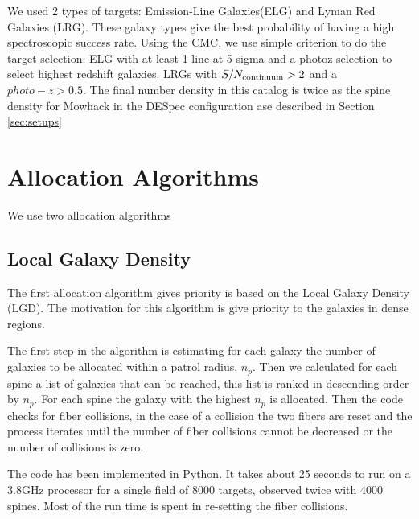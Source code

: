\documentclass{article}
\begin{document}


We used 2 types of targets: Emission-Line Galaxies(ELG) and Lyman Red
Galaxies (LRG). These galaxy types give the best probability of having
a high spectroscopic success rate. Using the CMC, we use simple
criterion to do the target selection: ELG with
at least 1 line at 5 sigma and a photoz selection to select highest
redshift galaxies. LRGs with $S/N_{\rm continuum}>2$ and a
$photo-z>0.5$.  The final number density in this catalog is twice as
the spine density for Mowhack in the DESpec configuration  ase
described in Section \ref{sec:setups}





\section{Allocation Algorithms}

We use two allocation algorithms

\subsection{Local Galaxy Density}
The first allocation algorithm gives priority is based on the Local
Galaxy Density (LGD). The motivation for this algorithm is give
priority to the galaxies in dense regions.

The first step in the algorithm is estimating for each galaxy the
number of galaxies to be allocated within a patrol radius,
$n_{p}$. Then we calculated for each spine a list of galaxies that can
be reached, this list is ranked in descending order by $n_{p}$. For
each spine the galaxy with the highest $n_{p}$ is allocated. Then the
code checks for fiber collisions, in the case of a collision the two
fibers are reset and the process iterates until the number of fiber
collisions cannot be decreased or the number of collisions is zero. 

The code has been implemented in Python. It takes about 25 seconds to
run on a 3.8GHz processor for a single field of 8000 targets, observed
twice with 4000 spines. Most of the run time is spent in re-setting
the fiber collisions. 
\end{document}
